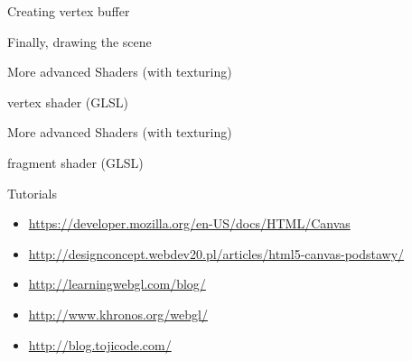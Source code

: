 \documentclass{beamer}
\begin{document}
\begin{frame}{Creating vertex buffer}



\end{frame}


\begin{frame}{Finally, drawing the scene}



\end{frame}


\begin{frame}{More advanced Shaders (with texturing)}

vertex shader (GLSL)


\end{frame}


\begin{frame}{More advanced Shaders (with texturing)}

fragment shader (GLSL)


\end{frame}

\begin{frame}{Tutorials}
\begin{itemize}
\item \url{https://developer.mozilla.org/en-US/docs/HTML/Canvas}
\item \url{http://designconcept.webdev20.pl/articles/html5-canvas-podstawy/}
\item \url{http://learningwebgl.com/blog/}
\item \url{http://www.khronos.org/webgl/}
\item \url{http://blog.tojicode.com/}
\end{itemize}

\end{frame}
\end{document}
